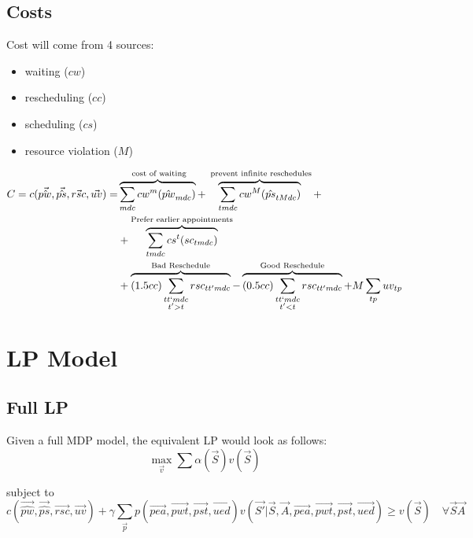 \documentclass{article}
\begin{document}
\subsection{Costs}
Cost will come from 4 sources:  
\begin{itemize} 
	\item waiting ($cw$)
	\item rescheduling ($cc$)
	\item scheduling ($cs$)
	\item resource violation ($M$)
\end{itemize}

\begin{equation}\begin{alignedat}{10}
	& C = c(\vec{\hat{pw}}, \vec{\hat{ps}}, \vec{rsc}, \vec{uv}) = 
		&& 
			\overbrace{ \sum_{mdc} cw^{m} (\hat{pw}_{mdc}) }^\text{
				cost of waiting}  + 
			\overbrace{ \sum_{tmdc} cw^{M} (\hat{ps}_{tMdc})}^\text{
				prevent infinite reschedules} + \\
	&	&&	+
				\overbrace{
					\sum_{tmdc} cs^{t} (sc_{tmdc})
				}^\text{Prefer earlier appointments} \\ 
	&	&&  +
			\overbrace{
				(1.5cc) \sum_{
				\substack{tt`mdc \\ t' > t}} 
				rsc_{tt'mdc}}^\text{Bad Reschedule} - 
			\overbrace{ 
				(0.5cc) \sum_{
				\substack{tt`mdc \\ t' < t}}
				rsc_{tt'mdc}}^\text{Good Reschedule} + 
			M \sum_{tp} uv_{tp}
\end{alignedat}\end{equation}

\section{LP Model}

\subsection{Full LP} 
Given a full MDP model, the equivalent LP would look as follows:
\begin{equation}
	\max_{\vec{v}} \sum \alpha (\vec{S}) v(\vec{S}) 
\end{equation}

subject to
\begin{equation}
	c(\vec{\hat{pw}}, \vec{\hat{ps}}, \vec{rsc}, \vec{uv}) + \gamma \sum_{\vec{p}} p(\vec{pea}, \vec{pwt}, \vec{pst}, \vec{ued}) v( \vec{S'} | \vec{S}, \vec{A}, \vec{pea}, \vec{pwt}, \vec{pst}, \vec{ued}) \ge v(\vec{S}) \quad \forall \vec{S} \vec{A}
\end{equation}
\end{document}

